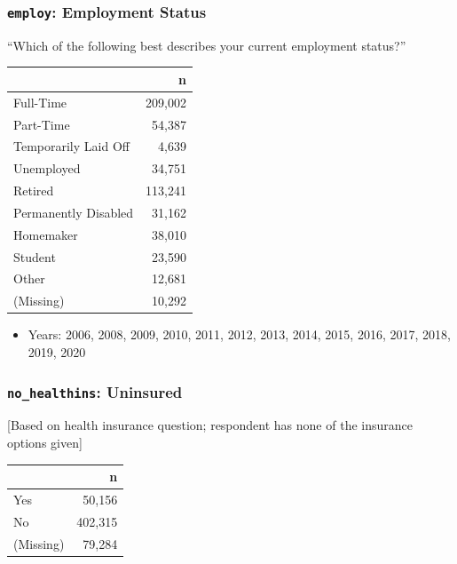 \documentclass[10pt,article,oneside]{memoir}
\theoremstyle{definition}
\begin{document}
\hypertarget{employ-employment-status}{%
\subsubsection{\texorpdfstring{\texttt{employ}: Employment
Status}{employ: Employment Status}}\label{employ-employment-status}}

``Which of the following best describes your current employment
status?''

\begin{table}[H]
\centering
\begin{tabular}[t]{lr}
\toprule
 & n\\
\midrule
Full-Time & 209,002\\
Part-Time & 54,387\\
Temporarily Laid Off & 4,639\\
Unemployed & 34,751\\
Retired & 113,241\\
Permanently Disabled & 31,162\\
Homemaker & 38,010\\
Student & 23,590\\
Other & 12,681\\
(Missing) & 10,292\\
\bottomrule
\end{tabular}
\end{table}

\begin{itemize}
\tightlist
\item
  Years: 2006, 2008, 2009, 2010, 2011, 2012, 2013, 2014, 2015, 2016,
  2017, 2018, 2019, 2020
\end{itemize}

\hypertarget{no_healthins-uninsured}{%
\subsubsection{\texorpdfstring{\texttt{no\_healthins}:
Uninsured}{no\_healthins: Uninsured}}\label{no_healthins-uninsured}}

{[}Based on health insurance question; respondent has none of the
insurance options given{]}

\begin{table}[H]
\centering
\begin{tabular}[t]{lr}
\toprule
 & n\\
\midrule
Yes & 50,156\\
No & 402,315\\
(Missing) & 79,284\\
\bottomrule
\end{tabular}
\end{table}
\end{document}
